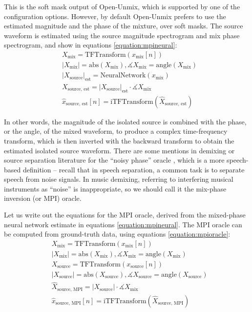 \documentclass[report.tex]{subfiles}
\begin{document}
This is the soft mask output of Open-Unmix, which is supported by one of the configuration options. However, by default Open-Unmix prefers to use the estimated magnitude and the phase of the mixture, over soft masks. The source waveform is estimated using the source magnitude spectrogram and mix phase spectrogram, and show in equations \eqref{equation:mpineural}:
\begin{align}\tag{29}\label{equation:mpineural}
	\nonumber & X_{\text{mix}} = \text{TFTransform}(x_{\text{mix}}[n])\\
	\nonumber & |X_{\text{mix}}| = \text{abs}(X_{\text{mix}}), \measuredangle{X_{\text{mix}}} = \text{angle}(X_{\text{mix}})\\
	\nonumber & {|X_{\text{source}}|}_{\text{est}} = \text{NeuralNetwork}(x_{\text{mix}})\\
	\nonumber & X_{\text{source, est}} = {|X_{\text{source}}|}_{\text{est}} \cdot \measuredangle{X_{\text{mix}}}\\
	\nonumber & \hat{x}_{\text{source, est}}[n] = \text{iTFTransform}(\hat{X}_{\text{source, est}})
\end{align}

In other words, the magnitude of the isolated source is combined with the phase, or the angle, of the mixed waveform, to produce a complex time-frequency transform, which is then inverted with the backward transform to obtain the estimated isolated source waveform. There are some mentions in demixing or source separation literature for the ``noisy phase'' oracle \parencite{noisyphase1, noisyphase2}, which is a more speech-based definition -- recall that in speech separation, a common task is to separate speech from noise signals. In music demixing, referring to interfering musical instruments as ``noise'' is inappropriate, so we should call it the mix-phase inversion (or MPI) oracle.

Let us write out the equations for the MPI oracle, derived from the mixed-phase neural network estimate in equations \eqref{equation:mpineural}. The MPI oracle can be computed from ground-truth data, using equations \eqref{equation:mpioracle}:
\begin{align}\tag{30}\label{equation:mpioracle}
	\nonumber & X_{\text{mix}} = \text{TFTransform}(x_{\text{mix}}[n])\\
	\nonumber & |X_{\text{mix}}| = \text{abs}(X_{\text{mix}}), \measuredangle{X_{\text{mix}}} = \text{angle}(X_{\text{mix}})\\
	\nonumber & X_{\text{source}} = \text{TFTransform}(x_{\text{source}}[n])\\
	\nonumber & |X_{\text{source}}| = \text{abs}(X_{\text{source}}), \measuredangle{X_{\text{source}}} = \text{angle}(X_{\text{source}})\\
	\nonumber & \hat{X}_{\text{source, MPI}} = |X_{\text{source}}| \cdot \measuredangle{X_{\text{mix}}}\\
	\nonumber & \hat{x}_{\text{source, MPI}}[n] = \text{iTFTransform}(\hat{X}_{\text{source, MPI}})
\end{align}
\end{document}
